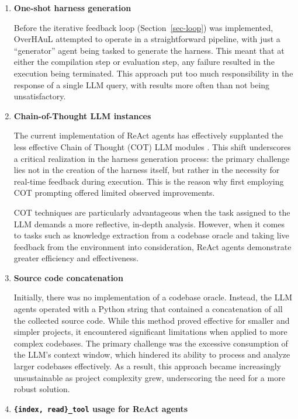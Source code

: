 \documentclass[
  a4paper,
]{scrreprt}
\theoremstyle{definition}
\theoremstyle{remark}
\begin{document}
\begin{enumerate}
\def\labelenumi{\arabic{enumi}.}
\item
  \textbf{One-shot harness generation}

  Before the iterative feedback loop (Section~\ref{sec-loop}) was
  implemented, OverHAuL attempted to operate in a straightforward
  pipeline, with just a ``generator'' agent being tasked to generate the
  harness. This meant that at either the compilation step or evaluation
  step, any failure resulted in the execution being terminated. This
  approach put too much responsibility in the response of a single LLM
  query, with results more often than not being unsatisfactory.
\item
  \textbf{Chain-of-Thought LLM instances}

  The current implementation of ReAct agents has effectively supplanted
  the less effective Chain of Thought (COT) LLM modules
  \autocite{chainofthought}. This shift underscores a critical
  realization in the harness generation process: the primary challenge
  lies not in the creation of the harness itself, but rather in the
  necessity for real-time feedback during execution. This is the reason
  why first employing COT prompting offered limited observed
  improvements.

  COT techniques are particularly advantageous when the task assigned to
  the LLM demands a more reflective, in-depth analysis. However, when it
  comes to tasks such as knowledge extraction from a codebase oracle and
  taking live feedback from the environment into consideration, ReAct
  agents demonstrate greater efficiency and effectiveness.
\item
  \textbf{Source code concatenation}

  Initially, there was no implementation of a codebase oracle. Instead,
  the LLM agents operated with a Python string that contained a
  concatenation of all the collected source code. While this method
  proved effective for smaller and simpler projects, it encountered
  significant limitations when applied to more complex codebases. The
  primary challenge was the excessive consumption of the LLM's context
  window, which hindered its ability to process and analyze larger
  codebases effectively. As a result, this approach became increasingly
  unsustainable as project complexity grew, underscoring the need for a
  more robust solution.
\item
  \textbf{\texttt{\{index,\ read\}\_tool} usage for ReAct agents}


\end{enumerate}
\end{document}
